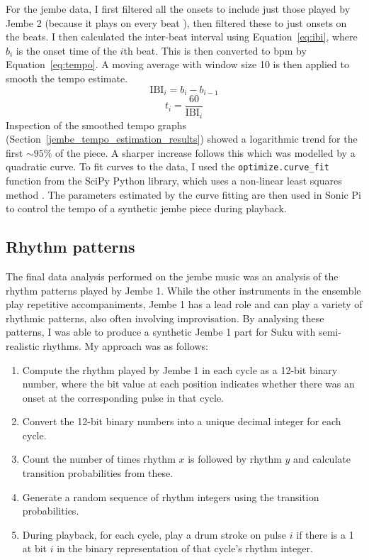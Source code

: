 \documentclass[12pt,twoside,openright]{report}
\begin{document}
For the jembe data, I first filtered all the onsets to include just those played
by Jembe 2 (because it plays on every beat \cite{jacoby2021}), then filtered these to
just onsets on the beats. I then calculated the inter-beat interval using Equation~\ref{eq:ibi}, where $b_i$ is the onset time of the $i$th beat. This is then converted to bpm by Equation~\ref{eq:tempo}. A moving average with window size 10 is then applied to smooth the tempo estimate.
\begin{equation}
    \mathrm{IBI}_i = b_i - b_{i-1}
    \label{eq:ibi}
\end{equation}
\begin{equation}
    t_i = \frac{60}{\mathrm{IBI}_i}
    \label{eq:tempo}
\end{equation}
Inspection of the smoothed tempo graphs (Section~\ref{jembe_tempo_estimation_results}) showed a logarithmic trend for the first $\sim95\%$ of the piece. A sharper increase follows this which was
modelled by a quadratic curve. To fit curves to the data, I used the \verb'optimize.curve_fit' function from the SciPy Python library, which uses a non-linear least
squares method \cite{more1977}. The parameters estimated by the curve fitting are then used in Sonic Pi
to control the tempo of a synthetic jembe piece during playback.


\subsection{Rhythm patterns} \label{rhythm_patterns}

The final data analysis performed on the jembe music was an analysis of the
rhythm patterns played by Jembe 1. While the other instruments in the ensemble
play repetitive accompaniments, Jembe 1 has a lead role and can play a variety
of rhythmic patterns, also often involving improvisation. By analysing these
patterns, I was able to produce a synthetic Jembe 1 part for Suku with
semi-realistic rhythms. My approach was as follows:

\begin{enumerate}
    \item Compute the rhythm played by Jembe 1 in each cycle as a 12-bit binary number, where the bit value at each position indicates whether there was an onset at the corresponding pulse in that cycle.
    \item Convert the 12-bit binary numbers into a unique decimal integer for each cycle.
    \item Count the number of times rhythm $x$ is followed by rhythm $y$ and calculate transition probabilities from these.
    \item Generate a random sequence of rhythm integers using the transition probabilities.
    \item During playback, for each cycle, play a drum stroke on pulse $i$ if there is a 1 at bit $i$ in the binary representation of that cycle's rhythm integer.
\end{enumerate}
\end{document}
